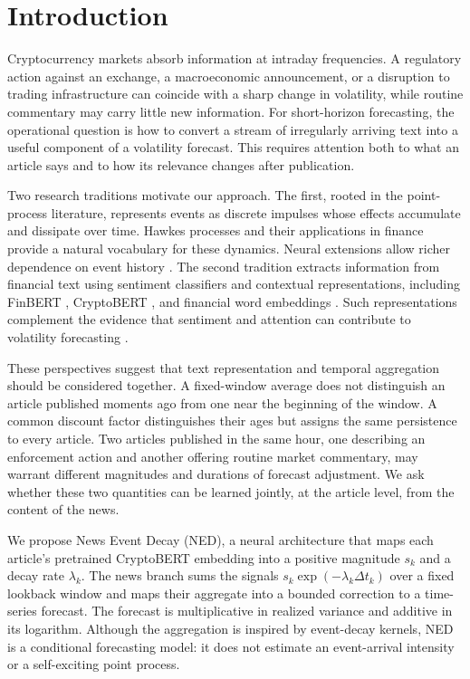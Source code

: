 \section{Introduction}\label{sec:introduction}

Cryptocurrency markets absorb information at intraday frequencies. A
regulatory action against an exchange, a macroeconomic announcement,
or a disruption to trading infrastructure can coincide with a sharp
change in volatility, while routine commentary may carry little new
information. For short-horizon forecasting, the operational question
is how to convert a stream of irregularly arriving text into a useful
component of a volatility forecast. This requires attention both to
what an article says and to how its relevance changes after publication.

Two research traditions motivate our approach. The first, rooted in
the point-process literature, represents events as discrete impulses
whose effects accumulate and dissipate over time. Hawkes processes
\citep{HAWKES1971} and their applications in finance \citep{Bacry2015}
provide a natural vocabulary for these dynamics. Neural extensions
allow richer dependence on event history \citep{Mei2017,Zuo2020}.
The second tradition extracts information from financial text using
sentiment classifiers and contextual representations, including FinBERT
\citep{Araci2019}, CryptoBERT \citep{Kulakowski_2023}, and financial
word embeddings \citep{Rahimikia2023}. Such representations complement
the evidence that sentiment and attention can contribute to volatility
forecasting \citep{Audrino2020}.

These perspectives suggest that text representation and temporal
aggregation should be considered together. A fixed-window average
does not distinguish an article published moments ago from one near
the beginning of the window. A common discount factor distinguishes
their ages but assigns the same persistence to every article. Two
articles published in the same hour, one describing an enforcement
action and another offering routine market commentary, may warrant
different magnitudes and durations of forecast adjustment. We ask
whether these two quantities can be learned jointly, at the article
level, from the content of the news.

We propose News Event Decay (NED), a neural architecture that maps
each article's pretrained CryptoBERT embedding into a positive
magnitude $s_k$ and a decay rate $\lambda_k$. The news branch sums
the signals $s_k\exp(-\lambda_k\Delta t_k)$ over a fixed lookback
window and maps their aggregate into a bounded correction to a
time-series forecast. The forecast is multiplicative in realized
variance and additive in its logarithm. Although the aggregation is
inspired by event-decay kernels, NED is a conditional forecasting
model: it does not estimate an event-arrival intensity or a
self-exciting point process.

